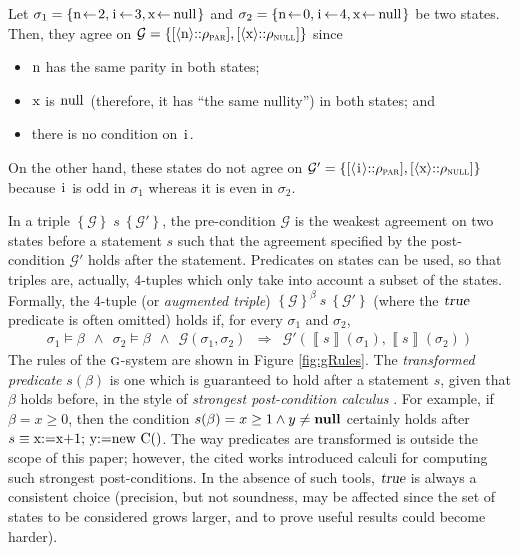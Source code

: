 \documentclass[prodmode,acmtocl]{acmsmall}
\def\state{\ensuremath{\sigma}\xspace}
\newcommand{\BIND}[2]{#1\!\leftarrow\!#2}
\def\uco{\ensuremath{\rho}\xspace}
\newcommand{\nil}{\mbox{\bf null}}
\newcommand{\true}{\mbox{\sl true}}
\newcommand{\0}{\mbox{\bf 0}}
\newcommand{\CODE}[1]{\ensuremath{\mbox{\lstinline!#1!}\xspace}\xspace}
\def\xx{\CODE{x}}
\def\ii{\CODE{i}}
\def\nn{\CODE{n}}
\newcommand{\SEMANTICS}[1]{\left\llbracket #1 \right\rrbracket}
\def\PARDOM{\ensuremath{\uco_{\textsc{par}}}\xspace}
\def\NULLDOM{\ensuremath{\uco_{\textsc{null}}}\xspace}
\def\PRED{\beta}
\def\AGREEM{\mathcal{G}}
\newcommand{\AGRS}[2]{[#2{::}#1]}
\newcommand{\RULENAME}[1]{\textsc{#1}}
\newcommand{\GSMTH}[1]{$\RULENAME{g}$-#1}
\def\GSYSTEM{\GSMTH{system}\xspace}
\newcommand{\TRIPLEB}[4]{\left\{#1\right\}^{#2}\ #3\ \left\{#4\right\}}
\begin{document}
\begin{example}
  \label{ex:agreement} Let $\state_1
  = \{\BIND{\mbox{\nn}}{2}, \BIND{\mbox{\ii}}{3}, \BIND{\mbox{\xx}}{\mbox{\CODE{null}}}\}$
  and $\state_2
  = \{\BIND{\mbox{\nn}}{0}, \BIND{\mbox{\ii}}{4}, \BIND{\mbox{\xx}}{\mbox{\CODE{null}}}\}$
  be two states.  Then, they agree on $\AGREEM
  = \{ \AGRS{\PARDOM}{\langle \mbox{\nn}\rangle}, \AGRS{\NULLDOM}{\langle \mbox{\xx}\rangle} \}$
  since
  \begin{itemize}
  \item \nn has the same parity in both states;
  \item \xx is \CODE{null} (therefore, it has ``the same nullity'')
    in both states; and
  \item there is no condition on \ii.
  \end{itemize}
  On the other hand, these states do not agree on $\AGREEM' = \{
  \AGRS{\PARDOM}{\langle \mbox{\ii}\rangle}, \AGRS{\NULLDOM}{\langle
    \mbox{\xx}\rangle} \}$ because \ii is odd in $\state_1$ whereas it
  is even in $\state_2$.
\end{example}

In a triple $\TRIPLEB{\AGREEM}{}{s}{\AGREEM'}$, the pre-condition
$\AGREEM$ is the weakest agreement on two states before a statement
$s$ such that the agreement specified by the post-condition $\AGREEM'$
holds after the statement.  Predicates on states can be used, so that
triples are, actually, 4-tuples which only take into account a subset
of the states.  Formally, the 4-tuple (or \emph{augmented triple})
$\TRIPLEB{\AGREEM}{\PRED}{s}{\AGREEM'}$ (where the $\true$ predicate
is often omitted) holds if, for every $\state_1$ and $\state_2$,
\[
  \begin{array}{rll}
    \state_1 \models \PRED\ \ \wedge\ \ \state_2 \models \PRED
    \ \ \wedge\ \ \AGREEM(\state_1,\state_2) & \Rightarrow &
    \AGREEM'(\SEMANTICS{s}(\state_1),\SEMANTICS{s}(\state_2))
  \end{array}
\]
\noindent
The rules of the \GSYSTEM are shown in Figure \ref{fig:gRules}.  The
\emph{transformed predicate} $s(\PRED)$ is one which is guaranteed to
hold after a statement $s$, given that $\PRED$ holds before, in the
style of \emph{strongest post-condition calculus} \cite{DS90,BN98}.
For example, if $\PRED = x\geq 0$, then the condition $s(\PRED) =
x\geq 1 \wedge y\neq \nil$ certainly holds after $s \equiv
\mbox{\CODE{x:=x+1; y:=new C()}}$.  The way predicates are transformed
is outside the scope of this paper; however, the cited works
introduced calculi for computing such strongest post-conditions.  In
the absence of such tools, $\true$ is always a consistent choice
(precision, but not soundness, may be affected since the set of states
to be considered grows larger, and to prove useful results could
become harder).
\end{document}
